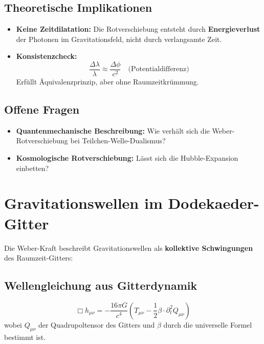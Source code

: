 \documentclass{article}
\begin{document}
\subsection*{Theoretische Implikationen}
\begin{itemize}
    \item \textbf{Keine Zeitdilatation:} Die Rotverschiebung entsteht durch \textbf{Energieverlust} der Photonen im Gravitationsfeld, nicht durch verlangsamte Zeit.
    \item \textbf{Konsistenzcheck:}
    \[
    \frac{\Delta \lambda}{\lambda} \approx \frac{\Delta \phi}{c^2} \quad \text{(Potentialdifferenz)}
    \]
    Erfüllt Äquivalenzprinzip, aber ohne Raumzeitkrümmung.
\end{itemize}

\subsection*{Offene Fragen}
\begin{itemize}
    \item \textbf{Quantenmechanische Beschreibung:} Wie verhält sich die Weber-Rotverschiebung bei Teilchen-Welle-Dualismus?
    \item \textbf{Kosmologische Rotverschiebung:} Lässt sich die Hubble-Expansion einbetten?
\end{itemize}

\section{Gravitationswellen im Dodekaeder-Gitter}
Die Weber-Kraft beschreibt Gravitationswellen als \textbf{kollektive Schwingungen} des Raumzeit-Gitters:

\subsection*{Wellengleichung aus Gitterdynamik}
\[
\Box h_{\mu\nu} = -\frac{16\pi G}{c^4} \left( T_{\mu\nu} - \frac{1}{2} \beta \cdot \partial_t^2 Q_{\mu\nu} \right)
\]
wobei $ Q_{\mu\nu} $ der Quadrupoltensor des Gitters und $ \beta $ durch die universelle Formel bestimmt ist.

\begin{center}
\end{center}
\end{document}
